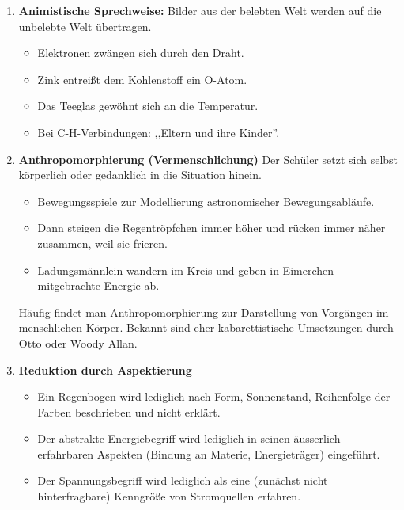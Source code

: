 \begin{enumerate}
	\item \textbf{Animistische Sprechweise:} Bilder aus der belebten
	Welt werden auf die unbelebte Welt \"{u}bertragen.
	
	\mip
	\begin{beisp}
	\begin{itemize}
		\item Elektronen zw\"{a}ngen sich durch den Draht.
		\item Zink entrei{\ss}t dem Kohlenstoff ein O-Atom.
		\item Das Tee\-glas gew\"{o}hnt sich an die Temperatur.
		\item Bei C-H-Verbindungen: ,,Eltern und ihre Kinder''.
	\end{itemize}
	\end{beisp}
	
	\item \textbf{Anthropomorphierung (Vermenschlichung)}
	Der Sch\"{u}ler setzt sich selbst k\"{o}rperlich oder gedanklich in die
	Situation hinein.
	
	\begin{beisp}
	\begin{itemize}
		\item Bewegungsspiele zur Modellierung
		astronomischer Bewegungsabl\"{a}ufe.
		\item Dann steigen die Regentr\"{o}pfchen immer h\"{o}her und r\"{u}cken immer
		n\"{a}her zusammen, weil sie frieren.
		\item Ladungsm\"{a}nnlein wandern im Kreis und geben in Eimerchen
		mitgebrachte Energie ab.
	\end{itemize}
	\end{beisp}
	
	H\"{a}ufig findet man Anthropomorphierung zur Darstellung von
	Vorg\"{a}ngen im menschlichen K\"{o}rper.
	Bekannt sind eher kabarettistische Umsetzungen durch Otto
	oder Woody Allan.
	
	\item \textbf{Reduktion durch Aspektierung}
	
	\begin{beisp}
	\begin{itemize}
		\item  Ein Regenbogen wird lediglich nach Form,
		Sonnenstand, Reihenfolge der Farben beschrieben und nicht
		erkl\"{a}rt.
		\item Der abstrakte Energiebegriff wird lediglich in
		seinen \"{a}usserlich erfahrbaren Aspekten (Bindung an Materie, Energietr\"{a}ger)
		eingef\"{u}hrt.
		\item Der Spannungsbegriff wird lediglich als eine
		(zun\"{a}chst nicht hinterfragbare) Kenngr\"{o}{\ss}e von
		Stromquellen erfahren.
	\end{itemize}
	\end{beisp}
	

\end{enumerate}
